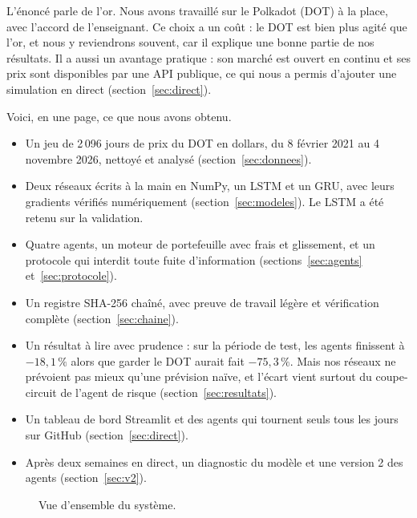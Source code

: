 \documentclass[11pt,a4paper]{article}
\begin{document}
L'énoncé parle de l'or. Nous avons travaillé sur le Polkadot (DOT) à la place, avec l'accord de l'enseignant. Ce choix a un coût :
le DOT est bien plus agité que l'or, et nous y reviendrons souvent, car il explique une bonne partie de nos résultats. Il a aussi un avantage
pratique : son marché est ouvert en continu et ses prix sont disponibles par une API publique, ce qui nous a permis d'ajouter une simulation
en direct (section~\ref{sec:direct}).

Voici, en une page, ce que nous avons obtenu.

\begin{itemize}
\item Un jeu de 2\,096 jours de prix du DOT en dollars, du 8 février 2021 au 4 novembre 2026, nettoyé et analysé (section~\ref{sec:donnees}).
\item Deux réseaux écrits à la main en NumPy, un LSTM et un GRU, avec leurs gradients vérifiés numériquement (section~\ref{sec:modeles}).
Le LSTM a été retenu sur la validation.
\item Quatre agents, un moteur de portefeuille avec frais et glissement, et un protocole qui interdit toute fuite d'information
(sections~\ref{sec:agents} et~\ref{sec:protocole}).
\item Un registre SHA-256 chaîné, avec preuve de travail légère et vérification complète (section~\ref{sec:chaine}).
\item Un résultat à lire avec prudence : sur la période de test, les agents finissent à $-18{,}1\,\%$ alors que garder le DOT aurait fait
$-75{,}3\,\%$. Mais nos réseaux ne prévoient pas mieux qu'une prévision naïve, et l'écart vient surtout du coupe-circuit de l'agent de
risque (section~\ref{sec:resultats}).
\item Un tableau de bord Streamlit et des agents qui tournent seuls tous les jours sur GitHub (section~\ref{sec:direct}).
\item Après deux semaines en direct, un diagnostic du modèle et une version 2 des agents (section~\ref{sec:v2}).
\end{itemize}

\begin{figure}[H]\centering
{}
\caption{Vue d'ensemble du système.}
\end{figure}
\end{document}
